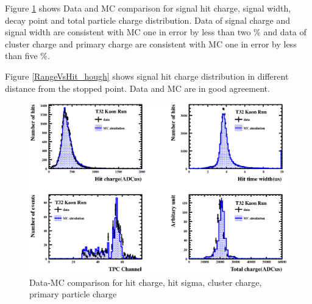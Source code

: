 Figure \ref{KsomeQuantities} shows Data and MC comparison for signal hit charge, signal width, decay point and total particle charge distribution.
Data of signal charge and signal width are consistent with MC one in error by less than two $\%$ and data of cluster charge and primary charge are consistent with  
MC one in error by less than five $\%$.

Figure \ref{RangeVsHit_hough} shows signal hit charge distribution in different distance from the stopped point.
Data and MC are in good agreement.

\begin{figure}[htbp]
  \begin{center}
    \includegraphics[width=1.0\hsize]{fig/cHit4_hough.eps}
  \end{center}    
    \caption{Data-MC comparison for hit charge, hit sigma, cluster charge, primary particle charge}
    \label{KsomeQuantities}
\end{figure}


